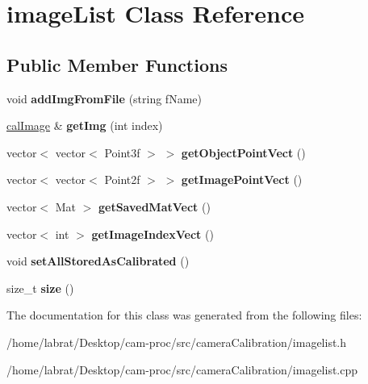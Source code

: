 \hypertarget{classimageList}{}\section{image\+List Class Reference}
\label{classimageList}
\subsection*{Public Member Functions}
\begin{DoxyCompactItemize}
\item 
void {\bfseries add\+Img\+From\+File} (string f\+Name)\hypertarget{classimageList_a5baeaa5ca189951833b7476910736f62}{}\label{classimageList_a5baeaa5ca189951833b7476910736f62}

\item 
\hyperlink{classcalImage}{cal\+Image} \& {\bfseries get\+Img} (int index)\hypertarget{classimageList_a92f4a237e89c78333012a7f1c62bfe52}{}\label{classimageList_a92f4a237e89c78333012a7f1c62bfe52}

\item 
vector$<$ vector$<$ Point3f $>$ $>$ {\bfseries get\+Object\+Point\+Vect} ()\hypertarget{classimageList_a914ba7c593ea46264697f0207f75b3b6}{}\label{classimageList_a914ba7c593ea46264697f0207f75b3b6}

\item 
vector$<$ vector$<$ Point2f $>$ $>$ {\bfseries get\+Image\+Point\+Vect} ()\hypertarget{classimageList_a8d28360a025bf44acb74e4b348651bf1}{}\label{classimageList_a8d28360a025bf44acb74e4b348651bf1}

\item 
vector$<$ Mat $>$ {\bfseries get\+Saved\+Mat\+Vect} ()\hypertarget{classimageList_a77fa0e75d8b1b7f54b1a057df40b5ea8}{}\label{classimageList_a77fa0e75d8b1b7f54b1a057df40b5ea8}

\item 
vector$<$ int $>$ {\bfseries get\+Image\+Index\+Vect} ()\hypertarget{classimageList_af2b450da04d8cd200c018915bb87296b}{}\label{classimageList_af2b450da04d8cd200c018915bb87296b}

\item 
void {\bfseries set\+All\+Stored\+As\+Calibrated} ()\hypertarget{classimageList_a9f4a56d7f7ade8381d59e9e88b6e0f59}{}\label{classimageList_a9f4a56d7f7ade8381d59e9e88b6e0f59}

\item 
size\+\_\+t {\bfseries size} ()\hypertarget{classimageList_a96122ae1fe63243d848daace8b8346e7}{}\label{classimageList_a96122ae1fe63243d848daace8b8346e7}

\end{DoxyCompactItemize}


The documentation for this class was generated from the following files\+:\begin{DoxyCompactItemize}
\item 
/home/labrat/\+Desktop/cam-\/proc/src/camera\+Calibration/imagelist.\+h\item 
/home/labrat/\+Desktop/cam-\/proc/src/camera\+Calibration/imagelist.\+cpp\end{DoxyCompactItemize}
